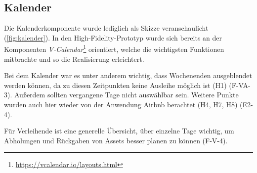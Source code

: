 \subsection{Kalender}
Die Kalenderkomponente wurde lediglich als Skizze veranschaulicht (\ref{fig:kalender}). In den High-Fidelity-Prototyp
wurde sich bereits an der Komponenten \textit{V-Calendar}\footnote{\url{https://vcalendar.io/layouts.html}}
orientiert, welche die wichtigsten Funktionen mitbrachte und so die Realisierung erleichtert.

Bei dem Kalender war es unter anderem wichtig, dass Wochenenden ausgeblendet werden können, da zu
diesen Zeitpunkten keine Ausleihe möglich ist (H1) (F-VA-3). Außerdem sollten vergangene Tage nicht
auswählbar sein. Weitere Punkte wurden auch hier wieder von der Anwendung Airbnb berachtet (H4, H7,
H8) (E2-4).

Für Verleihende ist eine generelle Übersicht, über einzelne Tage wichtig, um Abholungen und
Rückgaben von Assets besser planen zu können (F-V-4).

